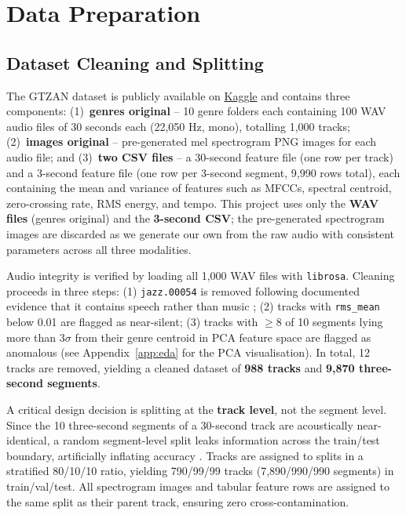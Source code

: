 \documentclass[10pt, twocolumn, a4paper]{article}
\begin{document}
\section{Data Preparation}

\subsection{Dataset Cleaning and Splitting}

The GTZAN dataset \cite{tzanetakis2002} is publicly available on
\href{https://www.kaggle.com/datasets/andradaolteanu/gtzan-dataset-music-genre-classification/data}{Kaggle}
and contains three components: (1)~\textbf{genres original} -- 10 genre folders each containing 100 WAV audio files of 30 seconds each (22,050 Hz, mono), totalling 1,000 tracks; (2)~\textbf{images original} -- pre-generated mel spectrogram PNG images for each audio file; and (3)~\textbf{two CSV files} -- a 30-second feature file (one row per track) and a 3-second feature file (one row per 3-second segment, 9,990 rows total), each containing the mean and variance of features such as MFCCs, spectral centroid, zero-crossing rate, RMS energy, and tempo. This project uses only the \textbf{WAV files} (genres original) and the \textbf{3-second CSV}; the pre-generated spectrogram images are discarded as we generate our own from the raw audio with consistent parameters across all three modalities.

Audio integrity is verified by loading all 1,000 WAV files with \texttt{librosa}. Cleaning proceeds in three steps: (1) \texttt{jazz.00054} is removed following documented evidence that it contains speech rather than music \cite{sturm2013}; (2) tracks with \texttt{rms\_mean} below 0.01 are flagged as near-silent; (3) tracks with $\geq 8$ of 10 segments lying more than $3\sigma$ from their genre centroid in PCA feature space are flagged as anomalous (see Appendix~\ref{app:eda} for the PCA visualisation). In total, 12 tracks are removed, yielding a cleaned dataset of \textbf{988 tracks} and \textbf{9,870 three-second segments}.

A critical design decision is splitting at the \textbf{track level}, not the segment level. Since the 10 three-second segments of a 30-second track are acoustically near-identical, a random segment-level split leaks information across the train/test boundary, artificially inflating accuracy \cite{sturm2013}. Tracks are assigned to splits in a stratified 80/10/10 ratio, yielding 790/99/99 tracks (7,890/990/990 segments) in train/val/test. All spectrogram images and tabular feature rows are assigned to the same split as their parent track, ensuring zero cross-contamination.
\end{document}

